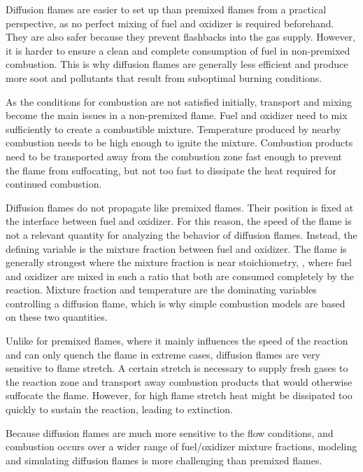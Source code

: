 %
Diffusion flames are easier to set up than premixed flames from a practical
perspective, as no perfect mixing of fuel and oxidizer is required beforehand.
%
They are also safer because they prevent flashbacks into the gas supply.
%
However, it is harder to ensure a clean and complete consumption of fuel in
non-premixed combustion.
%
This is why diffusion flames are generally less efficient and produce more
soot and pollutants that result from suboptimal burning conditions.
%

%
As the conditions for combustion are not satisfied initially, transport and
mixing become the main issues in a non-premixed flame.
%
Fuel and oxidizer need to mix sufficiently to create a combustible mixture.
%
Temperature produced by nearby combustion needs to be high enough to ignite
the mixture.
%
Combustion products need to be transported away from the combustion zone fast
enough to prevent the flame from suffocating, but not too fast to dissipate the
heat required for continued combustion.
%

%
Diffusion flames do not propagate like premixed flames.
%
Their position is fixed at the interface between fuel and oxidizer.
%
For this reason, the speed of the flame is not a relevant quantity for
analyzing the behavior of diffusion flames.
%
Instead, the defining variable is the mixture fraction between fuel and
oxidizer.
%
The flame is generally strongest where the mixture fraction is near
stoichiometry, \ie, where fuel and oxidizer are mixed in such a ratio that
both are consumed completely by the reaction.
%
Mixture fraction and temperature are the dominating variables controlling a
diffusion flame, which is why simple combustion models are based on these two
quantities.
%

%
Unlike for premixed flames, where it mainly influences the speed of the reaction
and can only quench the flame in extreme cases, diffusion flames are very
sensitive to flame stretch.
%
A certain stretch is necessary to supply fresh gases to the reaction zone and
transport away combustion products that would otherwise suffocate the flame.
%
However, for high flame stretch heat might be dissipated too quickly to sustain
the reaction, leading to extinction.
%

%
Because diffusion flames are much more sensitive to the flow conditions, and
combustion occurs over a wider range of fuel/oxidizer mixture fractions,
modeling and simulating diffusion flames is more challenging than premixed
flames.
%
%
%
